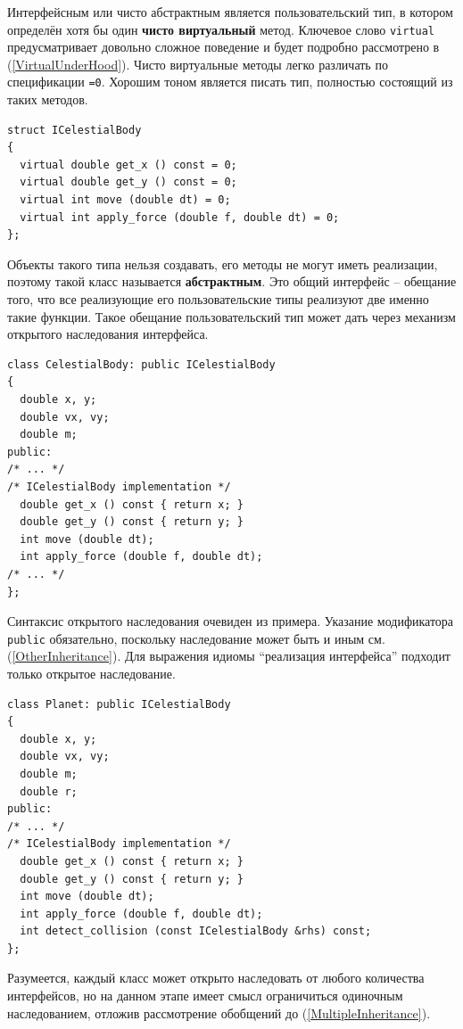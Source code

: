 \documentclass[a4paper,12pt,oneside]{article}
\begin{document}
Интерфейсным или чисто абстрактным является пользовательский тип, в котором определён хотя бы один \textbf{чисто виртуальный} метод. Ключевое слово \lstinline!virtual! предусматривает довольно сложное поведение и будет подробно рассмотрено в (\ref{VirtualUnderHood}). Чисто виртуальные методы легко различать по спецификации \lstinline!=0!. Хорошим тоном является писать тип, полностью состоящий из таких методов.

\begin{lstlisting}
struct ICelestialBody
{
  virtual double get_x () const = 0;
  virtual double get_y () const = 0;
  virtual int move (double dt) = 0;
  virtual int apply_force (double f, double dt) = 0;
};
\end{lstlisting}

Объекты такого типа нельзя создавать, его методы не могут иметь реализации, поэтому такой класс называется \textbf{абстрактным}. Это общий интерфейс -- обещание того, что все реализующие его пользовательские типы реализуют две именно такие функции. Такое обещание пользовательский тип может дать через механизм открытого наследования интерфейса.

\begin{lstlisting}
class CelestialBody: public ICelestialBody
{
  double x, y;
  double vx, vy;
  double m;
public:
/* ... */
/* ICelestialBody implementation */
  double get_x () const { return x; }
  double get_y () const { return y; }
  int move (double dt); 
  int apply_force (double f, double dt);
/* ... */
};
\end{lstlisting}

Синтаксис открытого наследования очевиден из примера. Указание модификатора \lstinline!public! обязательно, поскольку наследование может быть и иным см. (\ref{OtherInheritance}). Для выражения идиомы ``реализация интерфейса'' подходит только открытое наследование. 

\begin{lstlisting}
class Planet: public ICelestialBody
{
  double x, y;
  double vx, vy;
  double m;
  double r;
public:
/* ... */
/* ICelestialBody implementation */
  double get_x () const { return x; }
  double get_y () const { return y; }
  int move (double dt);
  int apply_force (double f, double dt);
  int detect_collision (const ICelestialBody &rhs) const;
};
\end{lstlisting}

Разумеется, каждый класс может открыто наследовать от любого количества интерфейсов, но на данном этапе имеет смысл ограничиться одиночным наследованием, отложив рассмотрение обобщений до (\ref{MultipleInheritance}).
\end{document}
